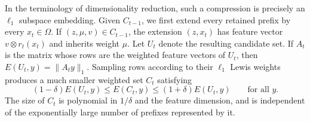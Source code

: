 \documentclass{article}
\begin{document}
In the terminology of dimensionality reduction, 
such a compression is precisely an $\ell_1$ subspace embedding.  Given
$C_{t-1}$, we first extend every retained prefix by every
$x_t\in\Omega$.  If $(z,\mu,v)\in C_{t-1}$, the extension $(z,x_t)$
has feature vector $v\otimes r_t(x_t)$ and inherits weight $\mu$.
Let $U_t$ denote the resulting candidate set.  If $A_t$ is the matrix
whose rows are the weighted feature vectors of $U_t$, then
$E(U_t,y)=\|A_ty\|_1$.  Sampling rows according to their $\ell_1$
Lewis weights produces a much smaller weighted set $C_t$ satisfying
\[
    (1-\delta)E(U_t,y)
    \leq
    E(C_t,y)
    \leq
    (1+\delta)E(U_t,y)
    \qquad
    \text{for all }y.
\]
The size of $C_t$ is polynomial in $1/\delta$ and the feature
dimension, and is independent of the exponentially large number of
prefixes represented by it.
\end{document}
